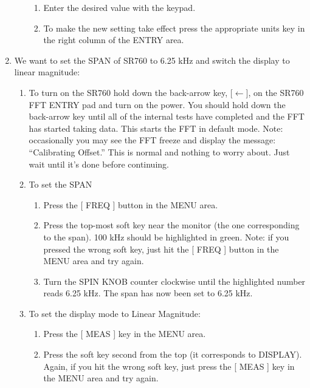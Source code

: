 \documentclass{../lab}
\begin{document}
\begin{enumerate}
\begin{enumerate}
\begin{enumerate}
            \item Enter the desired value with the keypad.

            \item To make the new setting take effect press the appropriate units key in the right column of the ENTRY area.

        \end{enumerate}

    \end{enumerate}

    \item We want to set the SPAN of SR760 to 6.25 kHz and switch the display to linear magnitude:
    \begin{enumerate}
        \item To turn on the SR760 hold down the back-arrow key, [$\leftarrow$], on the SR760 FFT ENTRY pad and turn on the power. You should hold down the back-arrow key until all of the internal tests have completed and the FFT has started taking data. This starts the FFT in default mode. Note: occasionally you may see the FFT freeze and display the message: ``Calibrating Offset.'' This is normal and nothing to worry about. Just wait until it's done before continuing.

        \item To set the SPAN
        \begin{enumerate}
            \item Press the [ FREQ ] button in the MENU area.

            \item Press the top-most soft key near the monitor (the one corresponding to the span). 100 kHz should be highlighted in green. Note: if you pressed the wrong soft key, just hit the [ FREQ ] button in the MENU area and try again.

            \item Turn the SPIN KNOB counter clockwise until the highlighted number reads 6.25 kHz. The span has now been set to 6.25 kHz.

        \end{enumerate}

        \item To set the display mode to Linear Magnitude:
        \begin{enumerate}
            \item Press the [ MEAS ] key in the MENU area.

            \item Press the soft key second from the top (it corresponds to DISPLAY). Again, if you hit the wrong soft key, just press the [ MEAS ] key in the MENU area and try again.


\end{enumerate}
\end{enumerate}
\end{enumerate}
\end{document}
